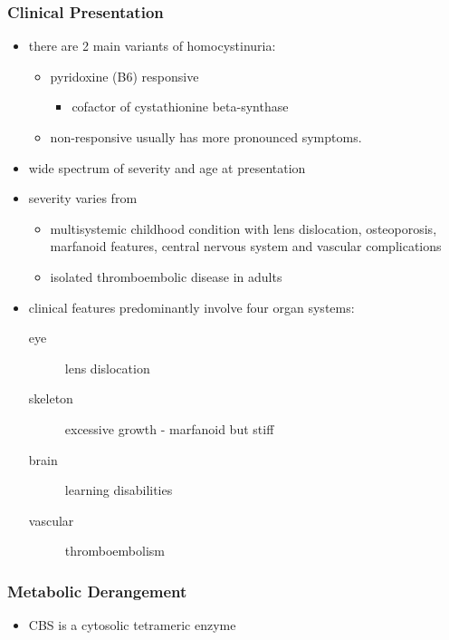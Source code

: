 \documentclass[12pt]{scrartcl}
\begin{document}
\begin{center}
\begin{center}
\subsubsection{Clinical Presentation}
\label{sec:orgbb448cc}
\begin{itemize}
\item there are 2 main variants of homocystinuria:
\begin{itemize}
\item pyridoxine (B6) responsive
\begin{itemize}
\item cofactor of cystathionine beta-synthase
\end{itemize}
\item non-responsive usually has more pronounced symptoms.
\end{itemize}
\item wide spectrum of severity and age at presentation
\item severity varies from
\begin{itemize}
\item multisystemic childhood condition with lens dislocation,
osteoporosis, marfanoid features, central nervous system and
vascular complications
\item isolated thromboembolic disease in adults
\end{itemize}
\item clinical features predominantly involve four organ systems:
\begin{description}
\item[{eye}] lens dislocation
\item[{skeleton}] excessive growth - marfanoid but stiff
\item[{brain}] learning disabilities
\item[{vascular}] thromboembolism
\end{description}
\end{itemize}
\subsubsection{Metabolic Derangement}
\label{sec:orgfba4c78}
\begin{itemize}
\item CBS is a cytosolic tetrameric enzyme
\end{itemize}



\end{center}
\end{center}
\end{document}
